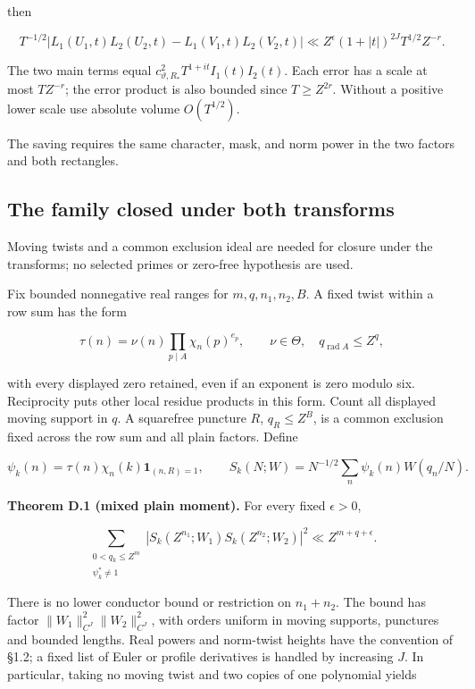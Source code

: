 \documentclass[11pt,a4paper]{article}
\begin{document}
then

\[
T^{-1/2}\left|L_1(U_1,t)L_2(U_2,t)-L_1(V_1,t)L_2(V_2,t)\right|
\ll Z^\epsilon(1+|t|)^{2J}T^{1/2}Z^{-r}.
\tag{D.2}\label{eq:D.2}
\]

The two main terms equal \(c_{\vartheta,R_*}^2T^{1+it}I_1(t)I_2(t)\). Each error has a scale at most \(TZ^{-r}\); the error product is also bounded since \(T\ge Z^{2r}\). Without a positive lower scale use absolute volume \(O(T^{1/2})\).

The saving requires the same character, mask, and norm power in the two factors and both rectangles.

\subsection{The family closed under both transforms}\label{sec:D.2}

Moving twists and a common exclusion ideal are needed for closure under the transforms; no selected primes or zero-free hypothesis are used.

Fix bounded nonnegative real ranges for \(m,q,n_1,n_2,B\). A fixed twist within a row sum has the form

\[
\tau(n)=\nu(n)\prod_{p\mid A}\chi_n(p)^{e_p},\qquad \nu\in\Theta,\quad q_{\operatorname{rad}A}\le Z^q,
\]

with every displayed zero retained, even if an exponent is zero modulo six. Reciprocity puts other local residue products in this form. Count all displayed moving support in \(q\). A squarefree puncture \(R\), \(q_R\le Z^B\), is a common exclusion fixed across the row sum and all plain factors. Define

\[
\psi_k(n)=\tau(n)\chi_n(k)\mathbf1_{(n,R)=1},\qquad
S_k(N;W)=N^{-1/2}\sum_n\psi_k(n)W(q_n/N).
\]

\textbf{Theorem D.1 (mixed plain moment).} For every fixed \(\epsilon>0\),

\[
\sum_{\substack{0<q_k\le Z^m\\\psi_k^*\ne1}}
 |S_k(Z^{n_1};W_1)S_k(Z^{n_2};W_2)|^2
\ll Z^{m+q+\epsilon}.
\tag{D.3}\label{eq:D.3}
\]

There is no lower conductor bound or restriction on \(n_1+n_2\). The bound has factor \(\|W_1\|_{C^J}^2\|W_2\|_{C^J}^2\), with orders uniform in moving supports, punctures and bounded lengths. Real powers and norm-twist heights have the convention of §1.2; a fixed list of Euler or profile derivatives is handled by increasing \(J\). In particular, taking no moving twist and two copies of one polynomial yields
\end{document}
